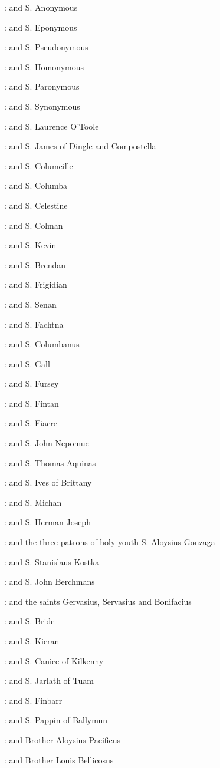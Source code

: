 :
and S. Anonymous 

:
and S. Eponymous 

:
and S. Pseudonymous 

:
and S. Homonymous 

:
and S. Paronymous 

:
and S. Synonymous 

:
and S. Laurence O'Toole 

:
and S. James of Dingle and Compostella 

:
and S. Columcille 

:
and S. Columba 

:
and S. Celestine 

:
and S. Colman 

:
and S. Kevin 

:
and S. Brendan 

:
and S. Frigidian 

:
and S. Senan 

:
and S. Fachtna 

:
and S. Columbanus 

:
and S. Gall 

:
and S. Fursey 

:
and S. Fintan 

:
and S. Fiacre 

:
and S. John Nepomuc 

:
and S. Thomas Aquinas 

:
and S. Ives of Brittany 

:
and S. Michan 

:
and S. Herman-Joseph 

:
and the three patrons of holy youth S. Aloysius Gonzaga 

:
and S. Stanislaus Kostka 

:
and S. John Berchmans 

:
and the saints Gervasius, Servasius and Bonifacius 

:
and S. Bride 

:
and S. Kieran 

:
and S. Canice of Kilkenny 

:
and S. Jarlath of Tuam 

:
and S. Finbarr 

:
and S. Pappin of Ballymun 

:
and Brother Aloysius Pacificus 

:
and Brother Louis Bellicosus 

